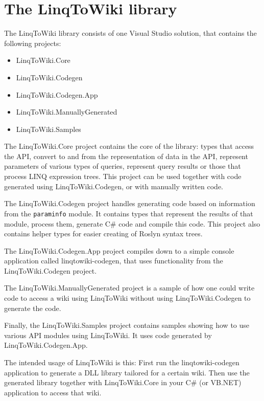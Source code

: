 \chapter{The LinqToWiki library}

The LinqToWiki library consists of one Visual Studio solution, that contains the following projects:

\begin{itemize}
\item LinqToWiki.Core
\item LinqToWiki.Codegen
\item LinqToWiki.Codegen.App
\item LinqToWiki.ManuallyGenerated
\item LinqToWiki.Samples
\end{itemize}

The LinqToWiki.Core project contains the core of the library:
types that access the API, convert to and from the representation of data in the API,
represent parameters of various types of queries, represent query results
or those that process LINQ expression trees.
This project can be used together with code generated using LinqToWiki.Codegen,
or with manually written code.

The LinqToWiki.Codegen project handles generating code based on information from the \texttt{paraminfo} module.
It contains types that represent the results of that module, process them, generate C\# code and compile this code.
This project also contains helper types for easier creating of Roslyn syntax trees.

The LinqToWiki.Codegen.App project compiles down to a simple console application called linqtowiki-codegen,
that uses functionality from the LinqToWiki.\allowbreak{}Codegen project.

The LinqToWiki.ManuallyGenerated project is a sample of how one could write code to access a wiki using LinqToWiki without using LinqToWiki.Codegen to generate the code.

Finally, the LinqToWiki.Samples project contains samples showing how to use various API modules using LinqToWiki.
It uses code generated by LinqToWiki.\allowbreak{}Codegen.\allowbreak{}App.

\medskip

The intended usage of LinqToWiki is this:
First run the linqtowiki-codegen application to generate a DLL library tailored for a certain wiki.
Then use the generated library together with LinqToWiki.Core in your C\# (or VB.NET) application to access that wiki.

